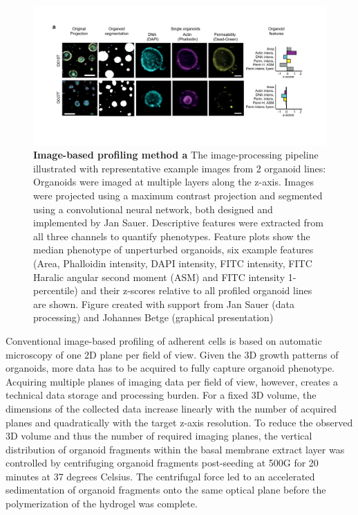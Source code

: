 \begin{flushleft}
\begin{figure}[h]
\centering
\includegraphics[width=\textwidth,
                height=\textheight,
                keepaspectratio]{figures/pdf/fig_135.pdf}
\caption{\textbf{Image-based profiling method a} The image-processing pipeline illustrated with representative example images from 2 organoid lines: Organoids were imaged at multiple layers along the z-axis. Images were projected using a maximum contrast projection and segmented using a convolutional neural network, both designed and implemented by Jan Sauer. Descriptive features were extracted from all three channels to quantify phenotypes. Feature plots show the median phenotype of unperturbed organoids, six example features (Area, Phalloidin intensity, DAPI intensity, FITC intensity, FITC Haralic angular second moment (ASM) and FITC intensity 1-percentile) and their z-scores relative to all profiled organoid lines are shown. Figure created with support from Jan Sauer (data processing) and Johannes Betge (graphical presentation)}
\label{fig_135}
\end{figure}

\bigbreak

Conventional image-based profiling of adherent cells is based on automatic microscopy of one 2D plane per field of view. Given the 3D growth patterns of organoids, more data has to be acquired to fully capture organoid phenotype. Acquiring multiple planes of imaging data per field of view, however, creates a technical data storage and processing burden. For a fixed 3D volume, the dimensions of the collected data increase linearly with the number of acquired planes and quadratically with the target z-axis resolution. To reduce the observed 3D volume and thus the number of required imaging planes, the vertical distribution of organoid fragments within the basal membrane extract layer was controlled by centrifuging organoid fragments post-seeding at 500G for 20 minutes at 37 degrees Celsius. The centrifugal force led to an accelerated sedimentation of organoid fragments onto the same optical plane before the polymerization of the hydrogel was complete.


\end{flushleft}
